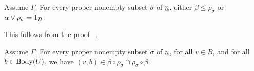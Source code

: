 \begin{lemma}
  \label{lem:fv_3-2}
Assume $\Gamma$. For every proper nonempty subset $\sigma$ of $\underline{n}$,
  either $\beta \leq \rho_\sigma$ or $\alpha \join \rho_\sigma = 1_B$.
\end{lemma}
  This follows from the proof ~\cite[Lemma~3.2]{Freese:2009}.

\begin{comment}
\begin{proof}
Let $\rho = \rho_\sigma$.
Suppose that $\beta \not\le {\rho}$ (or equivalently $(0,1) \notin
\rho$). Since $\beta$ is join irreducible, $\beta\meet\rho \le
\alpha$ and so $\beta\meet \rho = \alpha \meet \rho$.  Furthermore,
$\alpha\join {\rho} = \beta \join {\rho}$, or else we can find a
prime quotient between these two congruences that is perspective
with $\langle \alpha, \beta \rangle$.  But then the algebra
$\alg B/{\rho}$ has a prime quotient of type~\atyp\ whose minimal sets have nonempty
tails.  Since this algebra is isomorphic to a subdirect product of
fewer than $n$ members of $\mathcal S$, we conclude, by the minimality
of~$n$, that indeed $\alpha\join {\rho} = \beta \join {\rho}$.

Thus the set
\[
\mathcal P = \{\beta\meet\rho, \rho, \alpha, \beta, \alpha\join\rho\}
\]
forms a pentagon in $\Con \alg B$. Let $C$ be the
$(\alpha\join\rho)$-class that contains $0$ and let $M = C\mathrel{\cap} U$.
Note that $C$ contains $1$ and, since $\alg B$ is idempotent,  that
$C$ is a subuniverse of $\alg B$. By \cite[Lemma 2.4]{HM:1988}, we
conclude that the restriction to $M$ is a surjective lattice
homomorphism from the interval $I[0_B,
\alpha\join\rho]$ in $\Con{\alg B}$ to the interval $I[0_M,
(\alpha\join\rho)|_M]$ in $\Con{\alg B}|_M$.  Note that since $(0,1) \in
\beta|_M \mysetminus \alpha|_M$, this restriction map separates
$\alpha$ and $\beta$.  Then, the image under the restriction map of
the pentagon $\mathcal P$ is a pentagon in $\Con{\alg B}|_M$.  This
implies that $M$ contains some elements of the tail of $U$, since
otherwise $\Con{\alg B}|_M$ has a \malcev term operation and hence
is modular.
Thus, there is some $t$ in the tail of $U$ with $(0,t) \in
\alpha\join \rho$. Using Lemma~\ref{lem:fv_3-1} we conclude that $C =
B$ since it contains $\{0,1,t\}$.  Thus, $\alpha \join \rho = 1_B$.
\end{proof}

\end{comment}

\begin{lemma}\label{lem:nearperm}
Assume $\Gamma$.   For every proper nonempty subset $\sigma$ of $\underline{n}$,
  for all $v\in B$, and for all $b\in \operatorname{Body}(U)$, we have
  $(v,b) \in \beta \circ \rho_\sigma \cap \rho_\sigma \circ \beta$.
\end{lemma}

